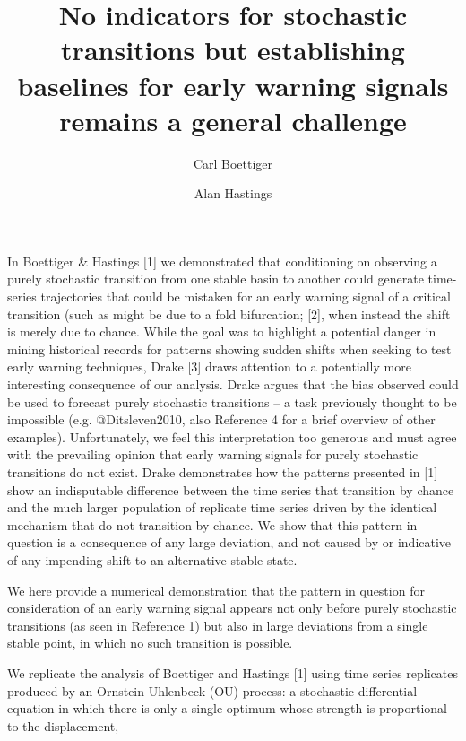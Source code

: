 \documentclass[review]{elsarticle} %
\begin{document}
\begin{frontmatter}
  \title{No indicators for stochastic transitions but establishing baselines for
         early warning signals remains a general challenge}
  \author[cstar]{Carl Boettiger}
  \address[cstar]{Center for Stock Assessment Research, Department of Applied Math and Statistics, University of California, Mail Stop SOE-2, Santa Cruz, CA 95064, USA}
  \author[esp]{Alan Hastings}
  \address[esp]{Department of Environmental Science and Policy, University of California, Davis, CA, 95616 United States}
 \end{frontmatter}


In Boettiger \& Hastings {[}1{]} we demonstrated that conditioning on
observing a purely stochastic transition from one stable basin to
another could generate time-series trajectories that could be mistaken
for an early warning signal of a critical transition (such as might be
due to a fold bifurcation; {[}2{]}, when instead the shift is merely due
to chance. While the goal was to highlight a potential danger in mining
historical records for patterns showing sudden shifts when seeking to
test early warning techniques, Drake {[}3{]} draws attention to a
potentially more interesting consequence of our analysis. Drake argues
that the bias observed could be used to forecast purely stochastic
transitions -- a task previously thought to be impossible (e.g.
@Ditsleven2010, also Reference 4 for a brief overview of other
examples). Unfortunately, we feel this interpretation too generous and
must agree with the prevailing opinion that early warning signals for
purely stochastic transitions do not exist. Drake demonstrates how the
patterns presented in {[}1{]} show an indisputable difference between
the time series that transition by chance and the much larger population
of replicate time series driven by the identical mechanism that do not
transition by chance. We show that this pattern in question is a
consequence of any large deviation, and not caused by or indicative of
any impending shift to an alternative stable state.

We here provide a numerical demonstration that the pattern in question
for consideration of an early warning signal appears not only before
purely stochastic transitions (as seen in Reference 1) but also in large
deviations from a single stable point, in which no such transition is
possible.

We replicate the analysis of Boettiger and Hastings {[}1{]} using time
series replicates produced by an Ornstein-Uhlenbeck (OU) process: a
stochastic differential equation in which there is only a single optimum
whose strength is proportional to the displacement,
\end{document}
